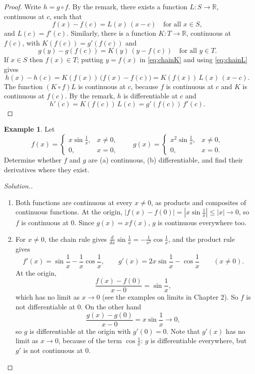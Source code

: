 \documentclass[11pt,a4paper]{article}
\numberwithin{equation}{section}
\theoremstyle{definition}
\newtheorem{exa}[thm]{Example}
\newenvironment{solution}
  {\renewcommand{\qedsymbol}{}\begin{proof}[\textit{Solution}.]}
  {\end{proof}}
\begin{document}
\begin{proof}
Write $h = g\circ f$. By the remark, there exists a function $L: S\longrightarrow \mathbb{R}$, continuous at $c$, such that
\begin{equation}\label{eq:chainL}
f(x) - f(c) = L(x)\, (x - c) \quad\text{for all } x\in S,
\end{equation}
and $L(c) = f'(c)$. Similarly, there is a function $K: T\longrightarrow \mathbb{R}$, continuous at $f(c)$, with $K(f(c)) = g'(f(c))$ and
\begin{equation}\label{eq:chainK}
g(y) - g(f(c)) = K(y)\, (y - f(c)) \quad\text{for all } y \in T.
\end{equation}
If $x\in S$ then $f(x)\in T$; putting $y = f(x)$ in \eqref{eq:chainK} and using \eqref{eq:chainL} gives
$$h(x) - h(c) = K(f(x))\, \bigl(f(x) - f(c)\bigr) = K(f(x))\, L(x)\, (x - c) .$$
The function $(K\circ f) L$ is continuous at $c$, because $f$ is continuous at $c$ and $K$ is continuous at $f(c)$. By the remark, $h$ is differentiable at $c$ and
$$h'(c) = K(f(c))\, L(c) = g'(f(c))\, f'(c) .$$
\end{proof}


\begin{exa}
Let
\[f(x) =
\begin{cases}
x \sin \frac{1}{x}, & x\neq 0,\\
0, & x = 0,
\end{cases}
\qquad
g(x) = \begin{cases}
x^2 \sin \frac{1}{x}, & x\neq 0,\\
0, & x  = 0.
\end{cases}
\]
Determine whether $f$ and $g$ are (a) continuous, (b) differentiable, and find their derivatives where they exist.
\end{exa}

\begin{solution}
\begin{enumerate}
\item[(a)] Both functions are continuous at every $x\neq 0$, as products and composites of continuous functions. At the origin, $|f(x) - f(0)| = \left|x \sin \frac{1}{x}\right| \leq |x|\longrightarrow 0$, so $f$ is continuous at $0$. Since $g(x) = x f(x)$, $g$ is continuous everywhere too.

\item[(b)] For $x\neq 0$, the chain rule gives $\frac{d}{dx}\sin \frac{1}{x} = -\frac{1}{x^2} \cos \frac{1}{x}$, and the product rule gives
$$f'(x) = \sin \frac{1}{x} - \frac{1}{x} \cos \frac{1}{x}, \qquad g'(x) = 2x \sin\frac{1}{x} - \cos \frac{1}{x} \qquad (x\neq 0).$$
At the origin,
$$\frac{f(x) - f(0)}{x - 0} = \sin\frac{1}{x},$$
which has no limit as $x\longrightarrow0$ (see the examples on limits in Chapter 2). So $f$ is not differentiable at $0$. On the other hand
$$\frac{g(x) - g(0)}{x - 0} = x \sin\frac{1}{x}\longrightarrow 0,$$
so $g$ is differentiable at the origin with $g'(0) = 0$. Note that $g'(x)$ has no limit as $x\longrightarrow0$, because of the term $\cos\frac{1}{x}$: $g$ is differentiable everywhere, but $g'$ is not continuous at $0$.
\end{enumerate}
\end{solution}
\end{document}
